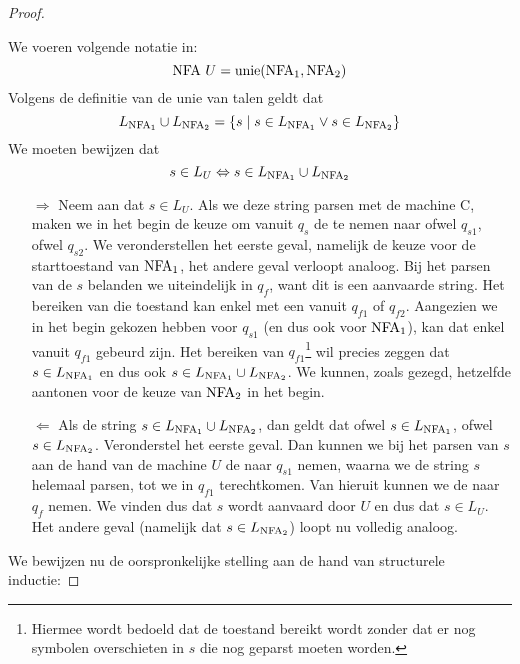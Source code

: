 \documentclass[../aanvullingen_cursus.tex]{subfiles}
\begin{document}
\begin{proof}
\begin{itemize}
		We voeren volgende notatie in: \[ \text{NFA } U = \operatorname*{unie}(\text{NFA}_{1},\text{NFA}_{2}) \] Volgens de definitie van de unie van talen geldt dat \[ L_{\text{NFA}_1} \cup L_{\text{NFA}_2}=\{s \mid s \in L_{\text{NFA}_1} \lor s \in L_{\text{NFA}_2}\} \] We moeten bewijzen dat \[ s \in L_{U} \Leftrightarrow s \in L_{\text{NFA}_1} \cup L_{\text{NFA}_2} \]
		\begin{enumerate}
			\item[\( \Rightarrow \)] Neem aan dat \( s \in L_U \). Als we deze string parsen met de machine C, maken we in het begin de keuze om vanuit \( q_s \) de \epsilonboog te nemen naar ofwel \( q_{s1} \), ofwel \( q_{s2} \). We veronderstellen het eerste geval, namelijk de keuze voor de starttoestand van \(\text{NFA}_1\), het andere geval verloopt analoog. Bij het parsen van de \( s \) belanden we uiteindelijk in \( q_f \), want dit is een aanvaarde string. Het bereiken van die toestand kan enkel met een \epsilonboog vanuit \( q_{f1} \) of \( q_{f2} \). Aangezien we in het begin gekozen hebben voor \( q_{s1} \) (en dus ook voor \( \text{NFA}_1 \)), kan dat enkel vanuit \( q_{f1} \) gebeurd zijn. Het bereiken van \(q_{f1}\)\footnote{Hiermee wordt bedoeld dat de toestand bereikt wordt zonder dat er nog symbolen overschieten in \( s \) die nog geparst moeten worden.} wil precies zeggen dat \(s \in L_{\text{NFA}_1}\) en dus ook \( s \in L_{\text{NFA}_1} \cup L_{\text{NFA}_2} \). We kunnen, zoals gezegd, hetzelfde aantonen voor de keuze van \( \text{NFA}_2 \) in het begin.
			\item[\(\Leftarrow\)] Als de string \( s \in L_{\text{NFA}_1} \cup L_{\text{NFA}_2} \), dan geldt dat ofwel \( s \in L_{\text{NFA}_1} \), ofwel \( s \in L_{\text{NFA}_2} \). Veronderstel het eerste geval. Dan kunnen we bij het parsen van \( s \) aan de hand van de machine \( U \) de \epsilonboog naar \(q_{s1}\) nemen, waarna we de string \(s\) helemaal parsen, tot we in \(q_{f1}\) terechtkomen. Van hieruit kunnen we de \epsilonboog naar \(q_f\) nemen. We vinden dus dat \(s\) wordt aanvaard door \(U\) en dus dat \(s \in L_U\). Het andere geval (namelijk dat \(s \in L_{\text{NFA}_2}\)) loopt nu volledig analoog.
		\end{enumerate}

	\end{itemize}

	We bewijzen nu de oorspronkelijke stelling aan de hand van structurele inductie:


\end{proof}
\end{document}
